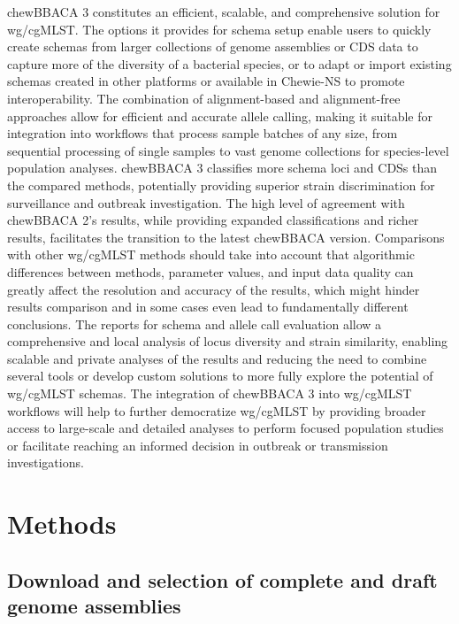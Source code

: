 chewBBACA 3 constitutes an efficient, scalable, and comprehensive solution for wg/cgMLST. The options it provides for schema setup enable users to quickly create schemas from larger collections of genome assemblies or CDS data to capture more of the diversity of a bacterial species, or to adapt or import existing schemas created in other platforms or available in Chewie-NS to promote interoperability. The combination of alignment-based and alignment-free approaches allow for efficient and accurate allele calling, making it suitable for integration into workflows that process sample batches of any size, from sequential processing of single samples to vast genome collections for species-level population analyses. chewBBACA 3 classifies more schema loci and CDSs than the compared methods, potentially providing superior strain discrimination for surveillance and outbreak investigation. The high level of agreement with chewBBACA 2's results, while providing expanded classifications and richer results, facilitates the transition to the latest chewBBACA version. Comparisons with other wg/cgMLST methods should take into account that algorithmic differences between methods, parameter values, and input data quality can greatly affect the resolution and accuracy of the results, which might hinder results comparison and in some cases even lead to fundamentally different conclusions. The reports for schema and allele call evaluation allow a comprehensive and local analysis of locus diversity and strain similarity, enabling scalable and private analyses of the results and reducing the need to combine several tools or develop custom solutions to more fully explore the potential of wg/cgMLST schemas. The integration of chewBBACA 3 into wg/cgMLST workflows will help to further democratize wg/cgMLST by providing broader access to large-scale and detailed analyses to perform focused population studies or facilitate reaching an informed decision in outbreak or transmission investigations.

\section{Methods} \label{sec:methods}

\subsection{Download and selection of complete and draft genome assemblies} \label{ssec:methods_ssec1}

